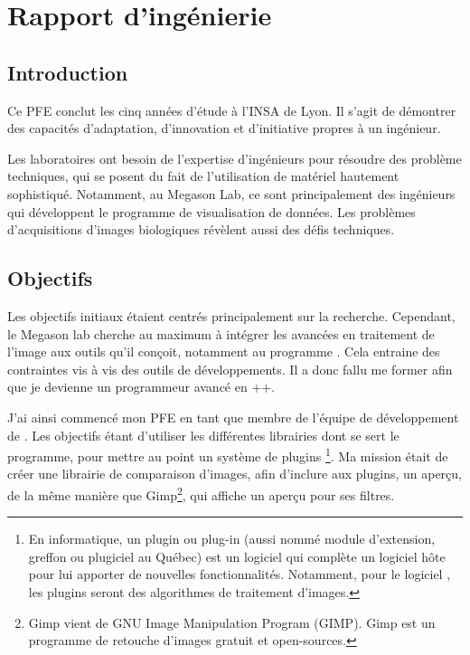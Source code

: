 
\chapter{Rapport d'ingénierie}


\section*{Introduction}
Ce PFE conclut les cinq années d'étude à l'INSA de Lyon. 
Il s'agit de démontrer des capacités d'adaptation,
d'innovation et d'initiative propres à un ingénieur.

Les laboratoires ont besoin de l'expertise d'ingénieurs
pour résoudre des problème techniques, qui se posent du fait de l'utilisation de matériel hautement sophistiqué.
Notamment, au Megason Lab, ce sont principalement des ingénieurs qui développent le programme de visualisation de données. 
Les problèmes d'acquisitions d'images biologiques révèlent aussi des défis techniques.
 
\section*{Objectifs}

Les objectifs initiaux étaient centrés principalement sur la recherche.
Cependant, le Megason lab cherche au maximum à intégrer les avancées en traitement de l'image aux outils qu'il conçoit,
 notamment au programme \gofigure. Cela entraine des contraintes vis à vis des outils de développements. 
 Il a donc fallu me former afin que je devienne un programmeur avancé en {\C++}. 
 
J'ai ainsi commencé mon PFE en tant que membre de l'équipe de développement de {\gofigure}.
 Les objectifs étant d'utiliser les différentes librairies dont se sert le programme, pour mettre au point un système de plugins
 \footnote{En informatique, un plugin ou plug-in (aussi nommé module d'extension, greffon ou plugiciel au Québec) est un logiciel qui complète un logiciel hôte pour lui apporter de nouvelles fonctionnalités. Notamment, pour le logiciel \gofigure, les plugins seront des algorithmes de traitement d'images.}. 
 Ma mission était de créer une librairie de comparaison d'images, afin d'inclure aux plugins, un aperçu, de la même manière que Gimp\footnote{Gimp vient de GNU Image Manipulation Program (GIMP). Gimp est un programme de retouche d'images gratuit et open-sources.
 }, qui affiche un aperçu pour ses filtres.

